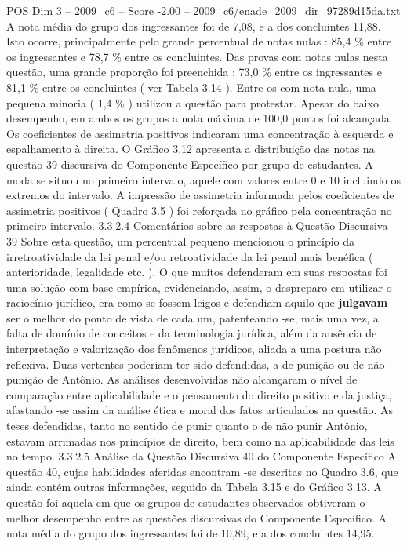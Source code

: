 \begin{textsample}{POS Dim 3 – 2009\_c6 – Score -2.00 – 2009\_c6/enade\_2009\_dir\_97289d15da.txt}
A nota média do grupo dos ingressantes foi de 7,08, e a dos concluintes 11,88.
Isto ocorre, principalmente pelo grande percentual de notas nulas : 85,4 \% entre os ingressantes e 78,7 \% entre os concluintes.
Das provas com notas nulas nesta questão, uma grande proporção foi preenchida : 73,0 \% entre os ingressantes e 81,1 \% entre os concluintes ( ver Tabela 3.14 ).
Entre os com nota nula, uma pequena minoria ( 1,4 \% ) utilizou a questão para protestar.
Apesar do baixo desempenho, em ambos os grupos a nota máxima de 100,0 pontos foi alcançada.
Os coeficientes de assimetria positivos indicaram uma concentração à esquerda e espalhamento à direita.
O Gráfico 3.12 apresenta a distribuição das notas na questão 39 discursiva do Componente Específico por grupo de estudantes.
A moda se situou no primeiro intervalo, aquele com valores entre 0 e 10 incluindo os extremos do intervalo.
A impressão de assimetria informada pelos coeficientes de assimetria positivos ( Quadro 3.5 ) foi reforçada no gráfico pela concentração no primeiro intervalo. 3.3.2.4 Comentários sobre as respostas à Questão Discursiva 39 Sobre esta questão, um percentual pequeno mencionou o princípio da irretroatividade da lei penal e/ou retroatividade da lei penal mais benéfica ( anterioridade, legalidade etc. ).
O que muitos defenderam em suas respostas foi uma solução com base empírica, evidenciando, assim, o despreparo em utilizar o raciocínio jurídico, era como se fossem leigos e defendiam aquilo que \textbf{julgavam} ser o melhor do ponto de vista de cada um, patenteando -se, mais uma vez, a falta de domínio de conceitos e da terminologia jurídica, além da ausência de interpretação e valorização dos fenômenos jurídicos, aliada a uma postura não reflexiva.
Duas vertentes poderiam ter sido defendidas, a de punição ou de não-punição de Antônio.
As análises desenvolvidas não alcançaram o nível de comparação entre aplicabilidade e o pensamento do direito positivo e da justiça, afastando -se assim da análise ética e moral dos fatos articulados na questão.
As teses defendidas, tanto no sentido de punir quanto o de não punir Antônio, estavam arrimadas nos princípios de direito, bem como na aplicabilidade das leis no tempo. 3.3.2.5 Análise da Questão Discursiva 40 do Componente Específico A questão 40, cujas habilidades aferidas encontram -se descritas no Quadro 3.6, que ainda contém outras informações, seguido da Tabela 3.15 e do Gráfico 3.13.
A questão foi aquela em que os grupos de estudantes observados obtiveram o melhor desempenho entre as questões discursivas do Componente Específico.
A nota média do grupo dos ingressantes foi de 10,89, e a dos concluintes 14,95.

\end{textsample}
